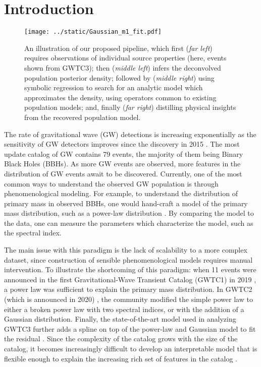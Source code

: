 \documentclass[nohyperref]{article}
\theoremstyle{plain}
\theoremstyle{definition}
\theoremstyle{remark}
\begin{document}
\section{Introduction}
\begin{figure*}[hbt!]
\texttt{[image: ../static/Gaussian\_m1\_fit.pdf]}
\caption{An illustration of our proposed pipeline, which first
(\textit{far left})
requires observations of individual source properties (here, events shown from GWTC3);
then
(\textit{middle left}) 
infers the deconvolved population posterior density;
followed by (\textit{middle right})
using symbolic regression to search for an analytic model which approximates the density, using
operators common to existing population models; and, finally
(\textit{far right}) distilling physical insights
from the recovered population model.
}
\label{fig:Gaussian_m1_fit}
\end{figure*}
The rate of gravitational wave (GW) detections is increasing exponentially as the sensitivity of GW detectors improves \cite{LIGOScientific:2021djp} since the discovery in 2015 \cite{Abbott:2016blz}.
The most update catalog of GW contains 79 events, the majority of them being Binary Black Holes (BBHs).
As more GW events are observed, more features in the distribution of GW events await to be discovered.
Currently, one of the most common ways to understand the observed GW population is through phenomenological modeling.
For example, to understand the distribution of primary mass in observed BBHs, one would hand-craft a model of the primary mass distribution, such as a power-law distribution \cite{LIGOScientific:2021psn}.
By comparing the model to the data, one can measure the parameters which characterize the model, such as the spectral index.

The main issue with this paradigm is the lack of scalability to a more complex dataset, since construction of sensible phenomenological models requires manual intervention.
To illustrate the shortcoming of this paradigm: 
when 11 events were announced in the first Gravitational-Wave Transient Catalog (GWTC1) in 2019 \cite{LIGOScientific:2018mvr}, a power law was sufficient to explain the primary mass distribution.
In GWTC2 (which is announced in 2020) \cite{LIGOScientific:2020kqk}, the community modified the simple power law to either a broken power law with two spectral indices, or with the addition of a Gaussian distribution.
Finally, the state-of-the-art model used in analyzing GWTC3 \cite{LIGOScientific:2021psn} further adds a spline on top of the power-law and Gaussian model to fit the residual \cite{Edelman:2021zkw}.
Since the complexity of the catalog grows with the size of the catalog,
it becomes increasingly difficult to develop an interpretable model that is flexible enough to explain the increasing rich set of features in the catalog . 
\end{document}
